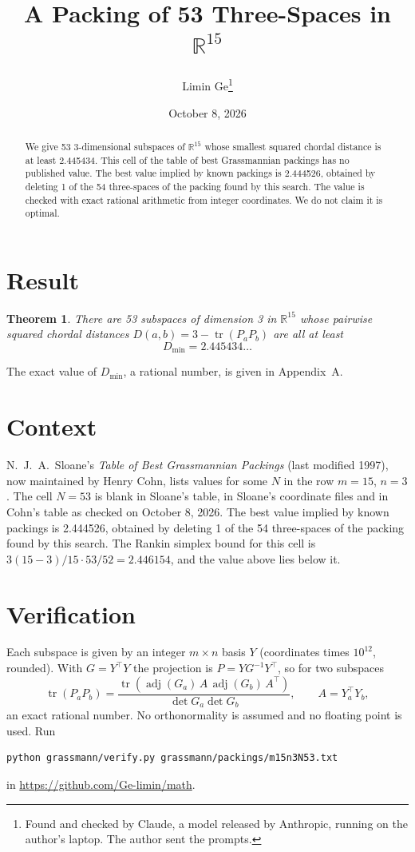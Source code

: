 \documentclass[11pt,a4paper]{article}
\title{A Packing of 53 Three-Spaces in $\mathbb{R}^{15}$}
\author{Limin Ge\thanks{Found and checked by Claude, a model released by Anthropic, running on the author's laptop. The author sent the prompts.}}
\date{October 8, 2026}
\newtheorem*{theorem}{Theorem}
\begin{document}
\maketitle
\begin{abstract}
We give 53 3-dimensional subspaces of $\mathbb{R}^{15}$ whose smallest squared chordal distance is at least 2.445434. This cell of the table of best Grassmannian packings has no published value. The best value implied by known packings is 2.444526, obtained by deleting 1 of the 54 three-spaces of the packing found by this search. The value is checked with exact rational arithmetic from integer coordinates. We do not claim it is optimal.
\end{abstract}

\section{Result}
\begin{theorem}
There are 53 subspaces of dimension 3 in $\mathbb{R}^{15}$ whose pairwise squared chordal distances $D(a,b) = 3 - \operatorname{tr}(P_aP_b)$ are all at least
\[ D_{\min} = 2.445434\ldots \]
\end{theorem}
The exact value of $D_{\min}$, a rational number, is given in Appendix~A.


\section{Context}
N.~J.~A.~Sloane's \emph{Table of Best Grassmannian Packings} (last modified 1997), now maintained by Henry Cohn, lists values for some $N$ in the row $m=15$, $n=3$. The cell $N=53$ is blank in Sloane's table, in Sloane's coordinate files and in Cohn's table as checked on October 8, 2026. The best value implied by known packings is 2.444526, obtained by deleting 1 of the 54 three-spaces of the packing found by this search. The Rankin simplex bound for this cell is $3(15-3)/15\cdot 53/52 = 2.446154$, and the value above lies below it.


\section{Verification}
Each subspace is given by an integer $m\times n$ basis $Y$ (coordinates times $10^{12}$, rounded). With $G=Y^\top Y$ the projection is $P=YG^{-1}Y^\top$, so for two subspaces
\[ \operatorname{tr}(P_aP_b)=\frac{\operatorname{tr}(\operatorname{adj}(G_a)\,A\,\operatorname{adj}(G_b)\,A^\top)}{\det G_a\det G_b},\qquad A=Y_a^\top Y_b, \]
an exact rational number. No orthonormality is assumed and no floating point is used. Run
\begin{verbatim}
python grassmann/verify.py grassmann/packings/m15n3N53.txt
\end{verbatim}
in \url{https://github.com/Ge-limin/math}.
\end{document}
